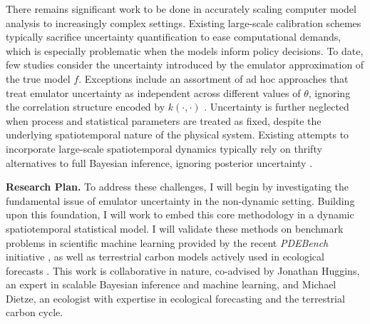 \documentclass[11pt]{article}
\begin{document}
 There remains significant work to be done in accurately scaling computer model analysis to increasingly complex settings. Existing large-scale calibration schemes typically sacrifice uncertainty quantification to ease computational demands, which is especially problematic when the models inform policy decisions. To date, few studies consider the uncertainty introduced by the emulator approximation of the true model $f$. Exceptions include an assortment of ad hoc approaches that treat emulator uncertainty as independent across different values of $\theta$, ignoring the correlation structure encoded by $k(\cdot, \cdot)$ \cite{Fer, Cleary}.
Uncertainty is further neglected when process and statistical parameters are treated as fixed, despite the underlying spatiotemporal nature of the physical system. Existing attempts to incorporate large-scale spatiotemporal dynamics typically rely on thrifty alternatives to full Bayesian inference, ignoring posterior uncertainty \cite{Sun}.



\noindent
\textbf{Research Plan.} To address these challenges, I will begin by investigating the fundamental issue of emulator uncertainty in the 
non-dynamic setting. Building upon this foundation, I will work to embed this core methodology in a dynamic spatiotemporal statistical model. I will validate these methods on benchmark problems in scientific machine learning provided by the recent \textit{PDEBench} initiative \cite{Surjanovic, Takamoto}, as well as terrestrial carbon models actively used in ecological forecasts \cite{Dietze}. This work is collaborative in nature, co-advised by Jonathan Huggins, an expert in scalable Bayesian inference and machine learning, and Michael Dietze, an ecologist with expertise in ecological forecasting and the terrestrial carbon cycle. 
\end{document}
